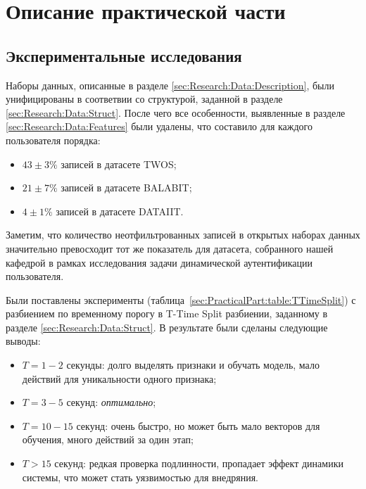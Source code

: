 \documentclass[12pt]{article}
\begin{document}
    \newpage



    \section{Описание практической части}
    \label{sec:PracticalPart}

    \subsection{Экспериментальные исследования}
    \label{sec:PracticalPart:ExperimentalStudy}

    \par Наборы данных, описанные в разделе  \ref{sec:Research:Data:Description}, были унифицированы в соответвии со структурой, заданной в разделе \ref{sec:Research:Data:Struct}. После чего все особенности, выявленные в разделе \ref{sec:Research:Data:Features} были удалены, что составило для каждого пользователя порядка:

    \begin{itemize}
        \item $ 43 \pm 3 \% $ записей в датасете TWOS;
        \item $ 21 \pm 7 \% $ записей в датасете BALABIT; 
        \item $  4 \pm 1 \% $ записей в датасете DATAIIT.
    \end{itemize}

    \par Заметим, что количество неотфильтрованных записей в открытых наборах данных значительно превосходит тот же показатель для датасета, собранного нашей кафедрой в рамках исследования задачи динамической аутентификации пользователя.

    \par Были поставлены эксперименты (таблица~\ref{sec:PracticalPart:table:TTimeSplit}) с разбиением по временному порогу в T-Time Split разбиении, заданному в разделе \ref{sec:Research:Data:Struct}. В результате были сделаны следующие выводы:
    \begin{itemize}
        \item $T=1-2$ секунды: долго выделять признаки и обучать модель, мало действий для уникальности одного признака;
        \item $T=3-5$ секунд: \textit{оптимально};
        \item $T=10-15$ секунд: очень быстро, но может быть мало векторов для обучения, много действий за один этап;
        \item $T > 15$ секунд: редкая проверка подлинности, пропадает эффект динамики системы, что может стать уязвимостью для внедряния.
    \end{itemize}
\end{document}
